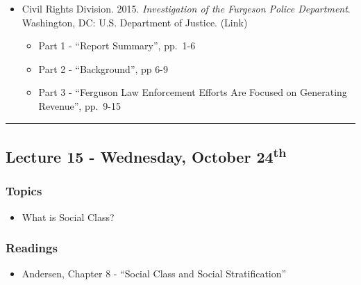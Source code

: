 \documentclass[]{book}
\providecommand{\tightlist}{%
  \setlength{\itemsep}{0pt}\setlength{\parskip}{0pt}}
\theoremstyle{definition}
\theoremstyle{definition}
\theoremstyle{definition}
\theoremstyle{remark}
\begin{document}
\begin{itemize}
\tightlist
\item
  Civil Rights Division. 2015. \emph{Investigation of the Furgeson
  Police Department}. Washington, DC: U.S. Department of Justice. (Link)

  \begin{itemize}
  \tightlist
  \item
    Part 1 - ``Report Summary'', pp.~1-6
  \item
    Part 2 - ``Background'', pp 6-9
  \item
    Part 3 - ``Ferguson Law Enforcement Efforts Are Focused on
    Generating Revenue'', pp.~9-15
  \end{itemize}
\end{itemize}

\begin{center}\rule{0.5\linewidth}{\linethickness}\end{center}

\hypertarget{lecture-15---wednesday-october-24th}{%
\subsection*{\texorpdfstring{Lecture 15 - Wednesday, October
24\textsuperscript{th}}{Lecture 15 - Wednesday, October 24th}}\label{lecture-15---wednesday-october-24th}}

\hypertarget{topics-17}{%
\subsubsection*{Topics}\label{topics-17}}

\begin{itemize}
\tightlist
\item
  What is Social Class?
\end{itemize}

\hypertarget{readings-16}{%
\subsubsection*{Readings}\label{readings-16}}

\begin{itemize}
\tightlist
\item
  Andersen, Chapter 8 - ``Social Class and Social Stratification''
\end{itemize}
\end{document}
